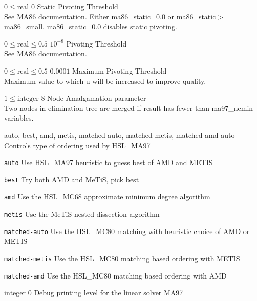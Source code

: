 %
{$0\leq\textrm{real}$}%
{$0$}%
{Static Pivoting Threshold\\
See MA86 documentation. Either ma86\_static=0.0 or ma86\_static$>$ma86\_small. ma86\_static=0.0 disables static pivoting.}%
{}

%
{$0\leq\textrm{real}\leq0.5$}%
{$10^{- 8}$}%
{Pivoting Threshold\\
See MA86 documentation.}%
{}

%
{$0\leq\textrm{real}\leq0.5$}%
{$0.0001$}%
{Maximum Pivoting Threshold\\
Maximum value to which u will be increased to improve quality.}%
{}

%
{$1\leq\textrm{integer}$}%
{$8$}%
{Node Amalgamation parameter\\
Two nodes in elimination tree are merged if result has fewer than ma97\_nemin variables.}%
{}

%
{\ttfamily auto, best, amd, metis, matched-auto, matched-metis, matched-amd}%
{auto}%
{Controls type of ordering used by HSL\_MA97}%
{\begin{list}{}{
\setlength{\parsep}{0em}
\setlength{\leftmargin}{5ex}
\setlength{\labelwidth}{2ex}
\setlength{\itemindent}{0ex}
\setlength{\topsep}{0pt}}
\item[\texttt{auto}] Use HSL\_MA97 heuristic to guess best of AMD and METIS
\item[\texttt{best}] Try both AMD and MeTiS, pick best
\item[\texttt{amd}] Use the HSL\_MC68 approximate minimum degree algorithm
\item[\texttt{metis}] Use the MeTiS nested dissection algorithm
\item[\texttt{matched-auto}] Use the HSL\_MC80 matching with heuristic choice of AMD or METIS
\item[\texttt{matched-metis}] Use the HSL\_MC80 matching based ordering with METIS
\item[\texttt{matched-amd}] Use the HSL\_MC80 matching based ordering with AMD
\end{list}
}

%
{$\textrm{integer}$}%
{$0$}%
{Debug printing level for the linear solver MA97}%
{}

